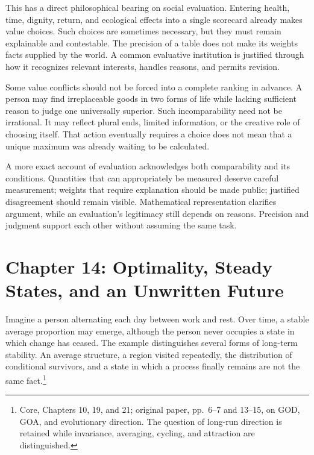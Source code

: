 \documentclass[
  english,
  11pt,
  oneside]{book}
\begin{document}
This has a direct philosophical bearing on social evaluation. Entering health, time, dignity, return, and ecological effects into a single scorecard already makes value choices. Such choices are sometimes necessary, but they must remain explainable and contestable. The precision of a table does not make its weights facts supplied by the world. A common evaluative institution is justified through how it recognizes relevant interests, handles reasons, and permits revision.

Some value conflicts should not be forced into a complete ranking in advance. A person may find irreplaceable goods in two forms of life while lacking sufficient reason to judge one universally superior. Such incomparability need not be irrational. It may reflect plural ends, limited information, or the creative role of choosing itself. That action eventually requires a choice does not mean that a unique maximum was already waiting to be calculated.

\begingroup{}

A more exact account of evaluation acknowledges both comparability and its conditions. Quantities that can appropriately be measured deserve careful measurement; weights that require explanation should be made public; justified disagreement should remain visible. Mathematical representation clarifies argument, while an evaluation's legitimacy still depends on reasons. Precision and judgment support each other without assuming the same task.

\par\endgroup

\chapter{Chapter 14: Optimality, Steady States, and an Unwritten Future}\label{ph-ch-14}

Imagine a person alternating each day between work and rest. Over time, a stable average proportion may emerge, although the person never occupies a state in which change has ceased. The example distinguishes several forms of long-term stability. An average structure, a region visited repeatedly, the distribution of conditional survivors, and a state in which a process finally remains are not the same fact.\footnote{\hypertarget{ph-note-37}{}Core, Chapters 10, 19, and 21; original paper, pp.~6--7 and 13--15, on GOD, GOA, and evolutionary direction. The question of long-run direction is retained while invariance, averaging, cycling, and attraction are distinguished.}
\end{document}
